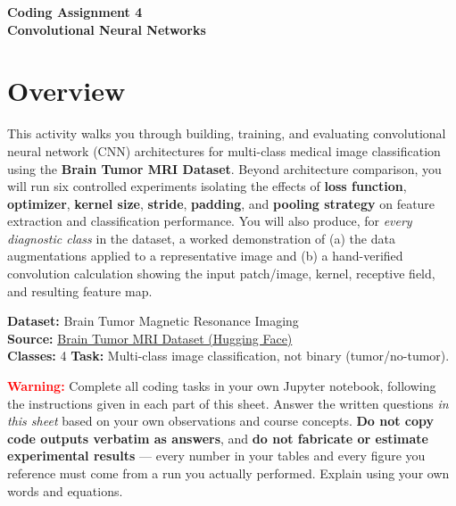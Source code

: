 \documentclass[12pt,a4paper]{article}
\begin{document}
\begin{center}
  {\LARGE\bfseries\color{headerblue}
    Coding Assignment 4\\[4pt]
    Convolutional Neural Networks}\\[10pt]
\end{center}

\section*{Overview}

This activity walks you through building, training, and evaluating convolutional neural network (CNN) architectures for multi-class medical image
classification using the \textbf{Brain Tumor MRI Dataset}. Beyond architecture
comparison, you will run six controlled experiments isolating the effects of
\textbf{loss function}, \textbf{optimizer}, \textbf{kernel size}, \textbf{stride},
\textbf{padding}, and \textbf{pooling strategy} on feature extraction and
classification performance. You will also produce, for \emph{every diagnostic class} in the
dataset, a worked demonstration of (a) the data augmentations applied to a
representative image and (b) a hand-verified convolution calculation showing
the input patch/image, kernel, receptive field, and resulting feature map.

\begin{instructionbox}
\textbf{Dataset:} Brain Tumor Magnetic Resonance Imaging\\
\textbf{Source:} \href{https://huggingface.co/datasets/alfa-bravo/Brain-Tumor-Mri-Dataset/blob/main/Brain\%20Tumor.rar}{Brain Tumor MRI Dataset (Hugging Face)}\\
\textbf{Classes:} 4
\textbf{Task:} Multi-class image classification, not binary (tumor/no-tumor).
\end{instructionbox}

\begin{warningbox}
\textbf{\textcolor{red}{Warning:}} Complete all coding tasks in your own Jupyter notebook,
following the instructions given in each part of this sheet. Answer the written
questions \emph{in this sheet} based on your own observations and course concepts.
\textbf{Do not copy code outputs verbatim as answers}, and \textbf{do not fabricate or
estimate experimental results} --- every number in your tables and every figure you
reference must come from a run you actually performed. Explain using your own words
and equations.
\end{warningbox}
\end{document}
